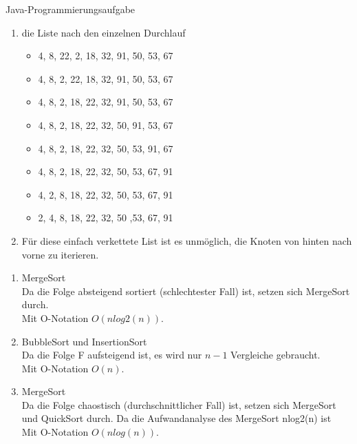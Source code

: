 \documentclass[12pt]{scrartcl}
\begin{document}
Java-Programmierungsaufgabe

\begin{enumerate}
  \item die Liste nach den einzelnen Durchlauf
    \begin{itemize}
      \item 4, 8, 22, 2, 18, 32, 91, 50, 53, 67
      \item 4, 8, 2, 22, 18, 32, 91, 50, 53, 67
      \item 4, 8, 2, 18, 22, 32, 91, 50, 53, 67
      \item 4, 8, 2, 18, 22, 32, 50, 91, 53, 67
      \item 4, 8, 2, 18, 22, 32, 50, 53, 91, 67
      \item 4, 8, 2, 18, 22, 32, 50, 53, 67, 91
      \item 4, 2, 8, 18, 22, 32, 50, 53, 67, 91
      \item 2, 4, 8, 18, 22, 32, 50 ,53, 67, 91
    \end{itemize} 
  \item Für diese einfach verkettete List ist es unmöglich, die Knoten von hinten nach vorne zu iterieren.
\end{enumerate}

\begin{enumerate}
  \item MergeSort\\
    Da die Folge absteigend sortiert (schlechtester Fall) ist, setzen sich MergeSort durch.\\
    Mit O-Notation $O(nlog2(n))$.
  \item BubbleSort und InsertionSort\\
    Da die Folge F aufsteigend ist, es wird nur $n-1$ Vergleiche gebraucht.\\
    Mit O-Notation $O(n)$.
  \item MergeSort\\
    Da die Folge chaostisch (durchschnittlicher Fall) ist, setzen sich MergeSort und QuickSort durch.
    Da die Aufwandanalyse des MergeSort nlog2(n) ist\\
    Mit O-Notation $O(nlog(n))$.
\end{enumerate}
\end{document}
